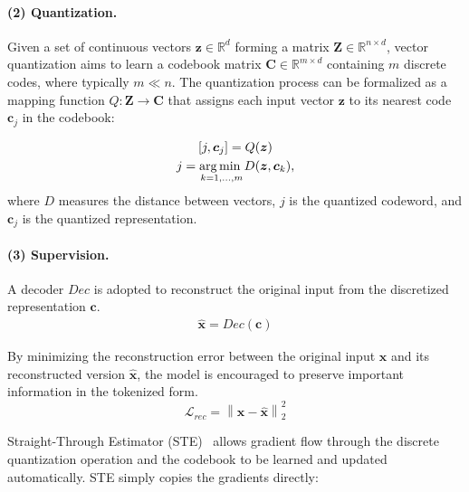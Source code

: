 \paragraph{(2) Quantization.}
Given a set of continuous vectors $\boldsymbol{z} \in \mathbb{R}^d$ forming a matrix $\boldsymbol{Z} \in \mathbb{R}^{n\times d}$, vector quantization aims to learn a codebook matrix $\boldsymbol{C} \in \mathbb{R}^{m\times d}$ containing $m$ discrete codes, where typically $m \ll n$. The quantization process can be formalized as a mapping function $Q: \boldsymbol{Z} \rightarrow \boldsymbol{C}$ that assigns each input vector $\boldsymbol{z}$ to its nearest code $\boldsymbol{c}_j$ in the codebook:

\begin{equation}\label{equ:quantization}
\begin{gathered}
    [j, \boldsymbol{c}_j] = Q(\boldsymbol{z})\\
    j = \underset{k=1,...,m}{\argmin} D(\boldsymbol{z}, \boldsymbol{c}_k),
\end{gathered}
\end{equation}
where $D$ measures the distance between vectors, $j$ is the quantized codeword, and $\boldsymbol{c}_j$ is the quantized representation.

\paragraph{(3) Supervision.}
A decoder $Dec$ is adopted to reconstruct the original input from the discretized representation $\boldsymbol{c}$. 
\begin{equation}\label{equ:decoding}
\begin{gathered}
    \hat{\boldsymbol{x}} = Dec(\boldsymbol{c})
\end{gathered}
\end{equation}

By minimizing the reconstruction error between the original input $\boldsymbol{x}$ and its reconstructed version $\hat{\boldsymbol{x}}$, the model is encouraged to preserve important information in the tokenized form.
\begin{equation}
\mathcal{L}_{rec}=\left\|\boldsymbol{x}-\boldsymbol{\hat{x}}\right\|_2^2
\end{equation}

Straight-Through Estimator (STE)~\cite{van2017vqvae} allows gradient flow through the discrete quantization operation and the codebook to be learned and updated automatically. 
STE simply copies the gradients directly:


